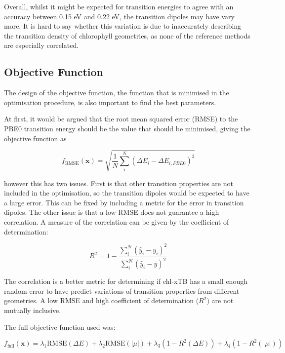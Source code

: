 Overall, whilst it might be expected for transition energies to agree with an accuracy 
between 0.15 eV and 0.22 eV, the transition dipoles may have vary more. It is hard
to say whether this variation is due to inaccurately describing the transition density
of chlorophyll geometries, as none of the reference methods are especially correlated.

\subsection{Objective Function}
\label{subsec:obj_func}
The design of the objective function, the function that is minimised in the optimisation
procedure, is also important to find the best parameters.

At first, it would be argued that the root mean squared error (RMSE) to the PBE0 
transition energy should be the value that should be minimised, giving the objective
function as

\begin{equation}
f_{\text{RMSE}}\left(\mathbf{x}\right) = \sqrt{ \frac{1}{N} \sum^N_i \left( \Delta E_i  - \Delta E_{i, PBE0}\right)^2}
\end{equation}

however this has two issues. First is that other transition properties are not 
included in the optimisation, so the transition dipoles would be expected to have 
a large error. This can be fixed by including a metric for the error in transition dipoles.
The other issue is that a low RMSE does not guarantee a high correlation. A measure
of the correlation can be given by the coefficient of determination:

\begin{equation}
R^2 = 1 - \frac{\sum^N_i \left(\hat{y}_i - y_i \right)^2}{\sum^N_i \left(\hat{y}_i - \bar{y}\right)^2}
\end{equation}

The correlation is a better metric for determining if chl-xTB has a small enough random
error to have predict variations of transition properties from different geometries.
A low RMSE and high coefficient of determination ($R^2$) are not mutually inclusive.

The full objective function used was:

\begin{equation}
f_{\text{full}} \left( \mathbf{x} \right) = \lambda_1 \text{RMSE} \left(\Delta E \right)+ \lambda_2 \text{RMSE}\left( \left| \mu \right| \right) + \lambda_3 \left(1 - R^2 \left( \Delta E \right)\right) + \lambda_4 \left( 1 - R^2 \left( \left| \mu \right| \right)\right)
\end{equation}


